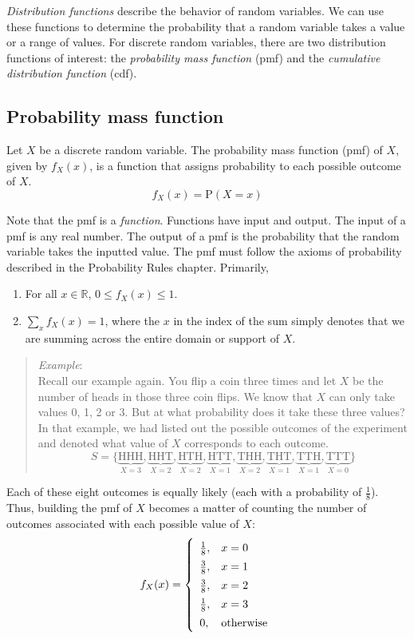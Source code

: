 \documentclass[
  letterpaper,
  DIV=11,
  numbers=noendperiod]{scrreprt}
\begin{document}
\emph{Distribution functions} describe the behavior of random variables.
We can use these functions to determine the probability that a random
variable takes a value or a range of values. For discrete random
variables, there are two distribution functions of interest: the
\emph{probability mass function} (pmf) and the \emph{cumulative
distribution function} (cdf).

\subsection{Probability mass function}\label{probability-mass-function}

Let \(X\) be a discrete random variable. The probability mass function
(pmf) of \(X\), given by \(f_X(x)\), is a function that assigns
probability to each possible outcome of \(X\). \[
f_X(x)=\mbox{P}(X=x)
\]

Note that the pmf is a \emph{function}. Functions have input and output.
The input of a pmf is any real number. The output of a pmf is the
probability that the random variable takes the inputted value. The pmf
must follow the axioms of probability described in the Probability Rules
chapter. Primarily,

\begin{enumerate}
\def\labelenumi{\arabic{enumi})}
\item
  For all \(x \in \mathbb{R}\), \(0 \leq f_X(x) \leq 1\).
\item
  \(\sum_x f_X(x) = 1\), where the \(x\) in the index of the sum simply
  denotes that we are summing across the entire domain or support of
  \(X\).
\end{enumerate}

\begin{quote}
\emph{Example}:\\
Recall our example again. You flip a coin three times and let \(X\) be
the number of heads in those three coin flips. We know that \(X\) can
only take values 0, 1, 2 or 3. But at what probability does it take
these three values? In that example, we had listed out the possible
outcomes of the experiment and denoted what value of \(X\) corresponds
to each outcome. \[
S=\{\underbrace{\mbox{HHH}}_{X=3}, \underbrace{\mbox{HHT}}_{X=2}, \underbrace{\mbox{HTH}}_{X=2}, \underbrace{\mbox{HTT}}_{X=1}, \underbrace{\mbox{THH}}_{X=2}, \underbrace{\mbox{THT}}_{X=1}, \underbrace{\mbox{TTH}}_{X=1}, \underbrace{\mbox{TTT}}_{X=0}\}
\]
\end{quote}

Each of these eight outcomes is equally likely (each with a probability
of \(\frac{1}{8}\)). Thus, building the pmf of \(X\) becomes a matter of
counting the number of outcomes associated with each possible value of
\(X\): \[
f_X(x)=\left\{ \renewcommand{\arraystretch}{1.4} \begin{array}{ll} \frac{1}{8}, & x=0 \\
\frac{3}{8}, & x=1 \\
\frac{3}{8}, & x=2 \\
\frac{1}{8}, & x=3 \\
0, & \mbox{otherwise} \end{array} \right . 
\]
\end{document}
